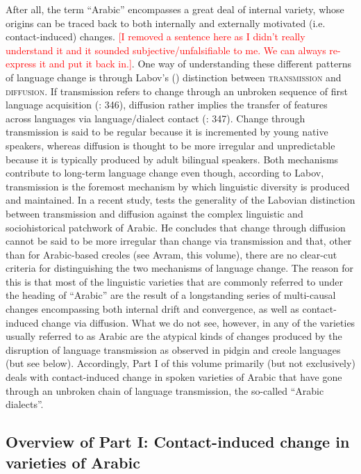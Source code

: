 \documentclass[output=paper]{langsci/langscibook}
\begin{document}
After all, the term ``Arabic'' encompasses a great deal of internal variety, whose origins can be traced back to both internally and externally motivated (i.e. contact-induced) changes. \textcolor{red}{[I removed a sentence here as I didn't really understand it and it sounded subjective/unfalsifiable to me. We can always re-express it and put it back in.]}. One way of understanding these different patterns of language change is through Labov's (\citeyear{Labov2007}) distinction between \textsc{transmission} and \textsc{diffusion}. If transmission refers to change through an unbroken sequence of first language acquisition (\citealt{Labov2007}: 346), diffusion rather implies the transfer of features across languages via language/dialect contact (\citealt{Labov2007}: 347). Change through transmission is said to be regular because it is incremented by young native speakers, whereas diffusion is thought to be more irregular and unpredictable because it is typically produced by adult bilingual speakers. Both mechanisms contribute to long-term language change even though, according to Labov, transmission is the foremost mechanism by which linguistic diversity is produced and maintained. In a recent study, \citet{Owens2018} tests the generality of the Labovian distinction between transmission and diffusion against the complex linguistic and sociohistorical patchwork of Arabic. He concludes that change through diffusion cannot be said to be more irregular than change via transmission and that, other than for Arabic-based creoles (see Avram, this volume), there are no clear-cut criteria for distinguishing the two mechanisms of language change. The reason for this is that most of the linguistic varieties that are commonly referred to under the heading of ``Arabic'' are the result of a longstanding series of multi-causal changes encompassing both internal drift and convergence, as well as contact-induced change via diffusion. What we do not see, however, in any of the varieties usually referred to as Arabic are the atypical kinds of changes produced by the disruption of language transmission as observed in pidgin and creole languages (but see below). Accordingly, Part I of this volume primarily (but not exclusively) deals with contact-induced change in spoken varieties of Arabic that have gone through an unbroken chain of language transmission, the so-called ``Arabic dialects''. 

\subsection{Overview of Part I: Contact-induced change in varieties of Arabic}\label{intropartIoverview}
\end{document}
